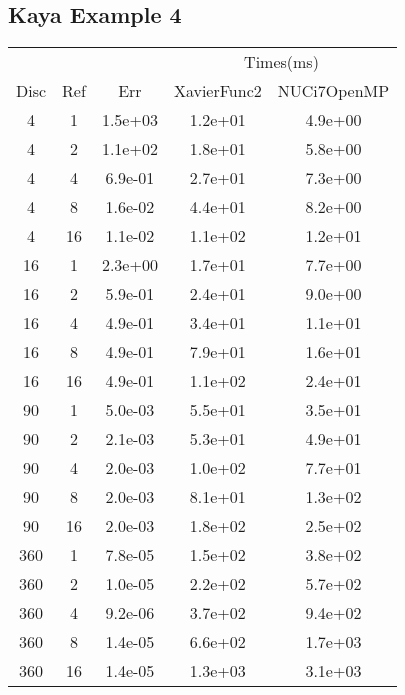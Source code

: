 \subsection{Kaya Example 4}
\begin{center}
  \begin{tabular}{c|c|c|c|c}
      &&&\multicolumn{2}{|c}{Times(ms)}\\
    Disc&Ref&Err&XavierFunc2&NUCi7OpenMP\\
    \hline
    4&1&1.5e+03&1.2e+01&4.9e+00\\
    4&2&1.1e+02&1.8e+01&5.8e+00\\
    4&4&6.9e-01&2.7e+01&7.3e+00\\
    4&8&1.6e-02&4.4e+01&8.2e+00\\
    4&16&1.1e-02&1.1e+02&1.2e+01\\
    \hline
    16&1&2.3e+00&1.7e+01&7.7e+00\\
    16&2&5.9e-01&2.4e+01&9.0e+00\\
    16&4&4.9e-01&3.4e+01&1.1e+01\\
    16&8&4.9e-01&7.9e+01&1.6e+01\\
    16&16&4.9e-01&1.1e+02&2.4e+01\\
    \hline
    90&1&5.0e-03&5.5e+01&3.5e+01\\
    90&2&2.1e-03&5.3e+01&4.9e+01\\
    90&4&2.0e-03&1.0e+02&7.7e+01\\
    90&8&2.0e-03&8.1e+01&1.3e+02\\
    90&16&2.0e-03&1.8e+02&2.5e+02\\
    \hline
    360&1&7.8e-05&1.5e+02&3.8e+02\\
    360&2&1.0e-05&2.2e+02&5.7e+02\\
    360&4&9.2e-06&3.7e+02&9.4e+02\\
    360&8&1.4e-05&6.6e+02&1.7e+03\\
    360&16&1.4e-05&1.3e+03&3.1e+03\\
    \hline
  \end{tabular}
\end{center}







